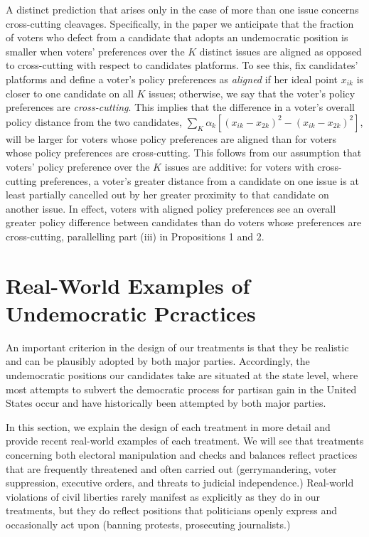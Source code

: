 \documentclass[12pt]{article}
\begin{document}
A distinct prediction that arises only in the case of more than one issue concerns cross-cutting cleavages. Specifically, in the paper we anticipate that the fraction of voters who defect from a candidate that adopts an undemocratic position is smaller when voters' preferences over the $K$ distinct issues are aligned as opposed to cross-cutting with respect to candidates platforms. To see this, fix candidates' platforms and define a voter's policy preferences as \emph{aligned} if her ideal point $x_{ik}$ is closer to one candidate on all $K$ issues; otherwise, we say that the voter's policy preferences are \emph{cross-cutting}. This implies that the difference in a voter's overall policy distance from the two candidates, $\sum_{K} \alpha_k [(x_{ik} - x_{2k})^2 - (x_{ik} - x_{2k})^2]$, will be larger for voters whose policy preferences are aligned than for voters whose policy preferences are cross-cutting. This follows from our assumption that voters' policy preference over the $K$ issues are additive: for voters with cross-cutting preferences, a voter's greater distance from a candidate on one issue is at least partially cancelled out by her greater proximity to that candidate on another issue. In effect, voters with aligned policy preferences see an overall greater policy difference between candidates than do voters whose preferences are cross-cutting, parallelling part (iii) in Propositions 1 and 2.


\newpage

\section{Real-World Examples of Undemocratic Pcractices}
\setcounter{figure}{0} 
\setcounter{table}{0} 

An important criterion in the design of our treatments is that they be realistic and can be plausibly adopted by both major parties. Accordingly, the undemocratic positions our candidates take are situated at the state level, where most attempts to subvert the democratic process for partisan gain in the United States occur and have historically been attempted by both major parties.

In this section, we explain the design of each treatment in more detail and provide recent real-world examples of each treatment. We will see that treatments concerning both electoral manipulation and checks and balances reflect practices that are frequently threatened and often carried out (gerrymandering, voter suppression, executive orders, and threats to judicial independence.) Real-world violations of civil liberties rarely manifest as explicitly as they do in our treatments, but they do reflect positions that politicians openly express and occasionally act upon (banning protests, prosecuting journalists.)
\end{document}
